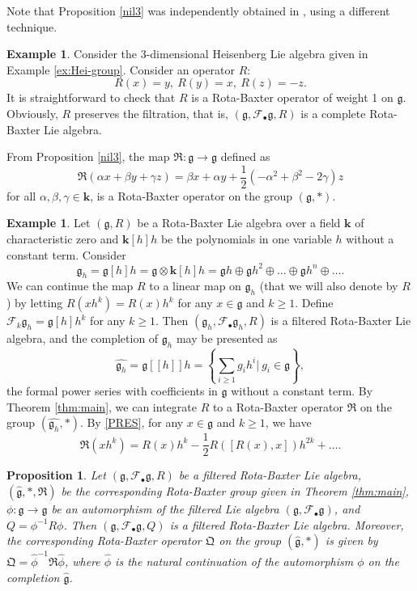 \documentclass[12pt]{amsart}
\newtheorem{pro}[thm]{Proposition}
\theoremstyle{definition}   %
\newtheorem{ex}[thm]{Example}
\newcommand{\bk}{{\mathbf{k}}}
\newcommand{\g}{\mathfrak g}
\newcommand{\huaF}{\mathcal{F}}
\newcommand{\frkR}{\mathfrak R}
\begin{document}
Note that Proposition \ref{nil3} was independently obtained in \cite{NR}, using a different technique.

\begin{ex}
Consider   the 3-dimensional Heisenberg Lie algebra given in Example \ref{ex:Hei-group}.
Consider an operator $R$:
$$
R(x)=y,\ R(y)=x,\ R(z)=-z.
$$
It is straightforward to check that $R$ is a Rota-Baxter operator of weight 1 on $\mathfrak g$. Obviously, $R$ preserves the filtration, that is, $(\g,\huaF_{\bullet}\g,R)$ is a complete Rota-Baxter Lie algebra.

From Proposition \ref{nil3},  the map $\mathfrak R:\g\rightarrow \g$ defined as
$$
\frkR(\alpha x+\beta y+\gamma z)=\beta x+\alpha y+\frac{1}{2}(-\alpha^2+\beta^2-2\gamma)z
$$
for all $\alpha,\beta,\gamma\in \bk$, is a Rota-Baxter operator on the group $(\g,*)$.

\end{ex}


\begin{ex}\label{gpoly}
Let $(\g,R)$ be a Rota-Baxter Lie algebra over a field $\bk$ of characteristic zero and $\bk[h]h$ be the polynomials in one variable $h$ without a constant term. Consider
$$\g_h=\g[h]h=\g\otimes \bk[h]h=\g h\oplus \g h^2\oplus\ldots\oplus \g h^n\oplus\ldots.
$$
We can continue the map $R$ to a linear map on $\g_h$ (that we will also denote by $R$) by letting $R(xh^k)=R(x)h^k$ for any $x\in \g$ and $k\geq 1$. Define $\huaF_{k}\g_h=\g[h]h^k$ for any $k\geq 1$. Then $(\g_h,\huaF_{\bullet}\g_h,R)$ is a filtered Rota-Baxter Lie algebra, and the completion
of $\g_h$ may be presented as
$$
\widehat{\g_h}=\g[[h]]h=\left\{\sum\limits_{i\geq 1}g_ih^i|\ g_i\in \g\right\},
$$
the formal power series with coefficients in $\g$ without a constant term. By Theorem \ref{thm:main}, we can integrate $R$ to a Rota-Baxter operator $\frkR$ on the group $(\widehat{\g_h},*)$. By \eqref{PRES}, for any $x\in \g$ and $k\geq 1$, we have
$$
\frkR(xh^k)=R(x)h^k-\frac{1}{2}R([R(x),x])h^{2k}+\ldots.
$$

\end{ex}



\begin{pro}
    Let $(\g, \huaF_{\bullet}\g, R)$ be a filtered Rota-Baxter Lie algebra, $(\widehat{\g},*,\frkR)$ be the corresponding Rota-Baxter group given in Theorem \ref{thm:main}, $\phi:\g\rightarrow \g$ be an automorphism of the filtered Lie algebra $(\g,\huaF_{\bullet}\g)$, and $Q=\phi^{-1}R\phi$. Then  $(\g, \huaF_{\bullet}\g, Q)$ is a filtered Rota-Baxter Lie algebra. Moreover, the corresponding  Rota-Baxter operator $\mathfrak Q$   on the group $(\widehat{\g},*)$ is given by $\mathfrak Q=\widehat{\phi}^{-1}\frkR\widehat{\phi}$, where $\widehat{\phi}$ is the natural continuation of the automorphism $\phi$ on the completion $\widehat{\g}$.
\end{pro}
\end{document}
